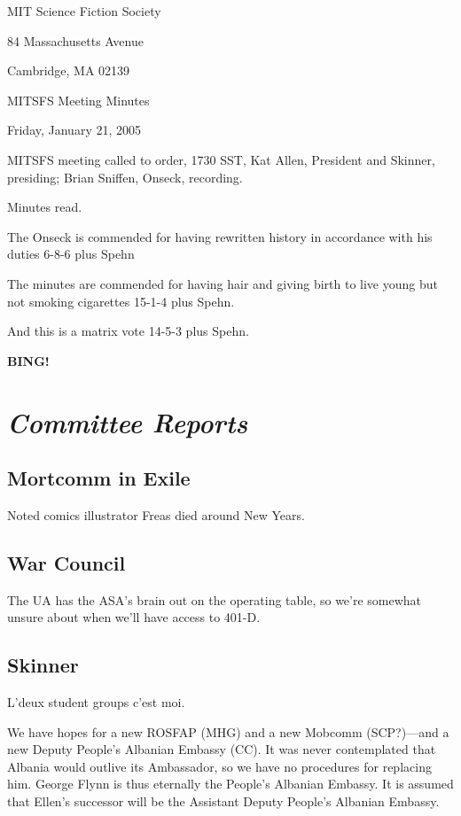 \documentclass[10pt]{article}
\newcommand{\bing}{{\bf BING!} }
\newcommand{\goto}[1]{\bing \vskip 12pt \section*{{\em{#1}}}}
\newcommand{\ps}{ plus Spehn\xspace}
\begin{document}
\begin{center}

MIT Science Fiction Society

84 Massachusetts Avenue

Cambridge, MA 02139

\vspace{12pt}

MITSFS Meeting Minutes

Friday, January 21, 2005

\end{center}

\vspace{18pt}

\setlength{\parskip}{6pt}

\noindent
MITSFS meeting called to order, 1730 SST, Kat Allen, President and
Skinner, presiding; Brian Sniffen,  Onseck, recording.

Minutes read.

The Onseck is commended for having rewritten history in accordance
with his duties 6-8-6\ps

The minutes are commended for having hair and giving birth to live
young but not smoking cigarettes 15-1-4\ps.

And this is a matrix vote 14-5-3\ps.

\goto{Committee Reports}
\subsection*{Mortcomm in Exile}
Noted comics illustrator Freas died around New Years.

\subsection*{War Council}
The UA has the ASA's brain out on the operating table, so we're
somewhat unsure about when we'll have access to 401-D.

\subsection*{Skinner}
L'deux student groups c'est moi.

We have hopes for a new ROSFAP (MHG) and a new Mobcomm (SCP?)---and a
new Deputy People's Albanian Embassy (CC).  It was never contemplated
that Albania would outlive its Ambassador, so we have no procedures
for replacing him.  George Flynn is thus eternally the People's
Albanian Embassy.  It is assumed that Ellen's successor will be the
Assistant Deputy People's Albanian Embassy.
\end{document}
